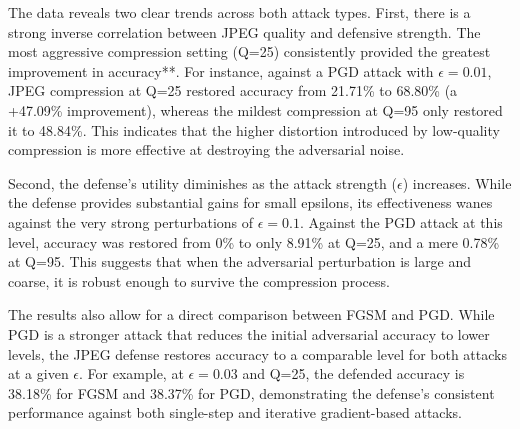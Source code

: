 \documentclass[../main.tex]{subfiles}
\begin{document}
The data reveals two clear trends across both attack types. First, there is a strong inverse correlation between JPEG quality and defensive strength. The most aggressive compression setting (Q=25) consistently provided the greatest improvement in accuracy**. For instance, against a PGD attack with $\epsilon=0.01$, JPEG compression at Q=25 restored accuracy from 21.71\% to 68.80\% (a +47.09\% improvement), whereas the mildest compression at Q=95 only restored it to 48.84\%. This indicates that the higher distortion introduced by low-quality compression is more effective at destroying the adversarial noise.

Second, the defense's utility diminishes as the attack strength ($\epsilon$) increases. While the defense provides substantial gains for small epsilons, its effectiveness wanes against the very strong perturbations of $\epsilon=0.1$. Against the PGD attack at this level, accuracy was restored from 0\% to only 8.91\% at Q=25, and a mere 0.78\% at Q=95. This suggests that when the adversarial perturbation is large and coarse, it is robust enough to survive the compression process.

The results also allow for a direct comparison between FGSM and PGD. While PGD is a stronger attack that reduces the initial adversarial accuracy to lower levels, the JPEG defense restores accuracy to a comparable level for both attacks at a given $\epsilon$. For example, at $\epsilon=0.03$ and Q=25, the defended accuracy is 38.18\% for FGSM and 38.37\% for PGD, demonstrating the defense's consistent performance against both single-step and iterative gradient-based attacks.
\end{document}
